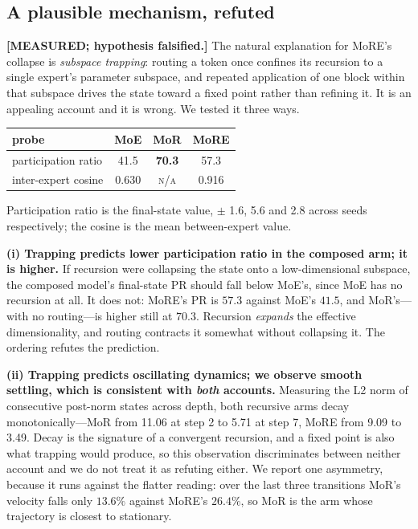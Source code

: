 \subsection{A plausible mechanism, refuted}
\label{sec:trapping}

\textbf{[MEASURED; hypothesis falsified.]} The natural explanation for MoRE's
collapse is \emph{subspace trapping}: routing a token once confines its recursion
to a single expert's parameter subspace, and repeated application of one block
within that subspace drives the state toward a fixed point rather than refining it.
It is an appealing account and it is wrong. We tested it three ways.

\begin{center}
{\dispsize
\setlength{\tabcolsep}{9pt}\renewcommand{\arraystretch}{1.25}
\small
\begin{tabular}{lccc}
\toprule
probe & MoE & MoR & MoRE \\
\midrule
participation ratio    & 41.5 & \textbf{70.3} & 57.3 \\
inter-expert cosine    & 0.630 & \textsc{n/a} & 0.916 \\
\bottomrule
\end{tabular}
}
\end{center}
Participation ratio is the final-state value, $\pm$ 1.6, 5.6 and 2.8 across
seeds respectively; the cosine is the mean between-expert value.

\textbf{(i) Trapping predicts lower participation ratio in the composed arm;
it is higher.} If recursion were collapsing the state onto a low-dimensional
subspace, the composed model's final-state PR should fall below MoE's, since MoE
has no recursion at all. It does not: MoRE's PR is $57.3$ against MoE's $41.5$,
and MoR's---with no routing---is higher still at $70.3$. Recursion \emph{expands}
the effective dimensionality, and routing contracts it somewhat without collapsing
it. The ordering refutes the prediction.

\textbf{(ii) Trapping predicts oscillating dynamics; we observe smooth settling,
which is consistent with \emph{both} accounts.} Measuring the L2 norm of
consecutive post-norm states across depth, both recursive arms decay
monotonically---MoR from 11.06 at step 2 to 5.71 at step 7, MoRE from 9.09 to
3.49. Decay is the signature of a convergent recursion, and a fixed point is
also what trapping would produce, so this observation discriminates between
neither account and we do not treat it as refuting either. We report one
asymmetry, because it runs against the flatter reading: over the last three
transitions MoR's velocity falls only $13.6\%$ against MoRE's $26.4\%$, so MoR
is the arm whose trajectory is closest to stationary.


